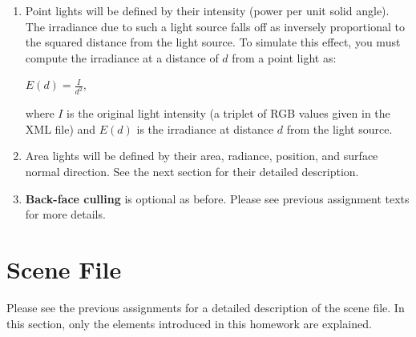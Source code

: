 \documentclass[12pt]{article}
\begin{document}
\begin{enumerate}
\item \textbf{}Point lights will be defined by their intensity (power
        per unit solid angle). The irradiance due to such a light source
falls off as inversely proportional to the squared distance from the
light source. To simulate this effect, you must compute the irradiance
at a distance of $d$ from a point light as:
%
\begin{center}
$E(d) = \frac{I}{d^2}$,
\end{center}
%
where $I$ is the original light intensity (a triplet of RGB values given
in the XML file) and $E(d)$ is the irradiance at distance $d$
from the light source.

\item \textbf{}Area lights will be defined by their area, radiance,
position, and surface normal direction. See the next section for 
their detailed description.



\item \textbf{Back-face culling} is optional as before. Please see
previous assignment texts for more details.

\end{enumerate}

\section{Scene File}
\label{sec:sceneFile}

\noindent Please see the previous assignments for a detailed description of the scene file.
In this section, only the elements introduced in this homework are explained.
\end{document}
